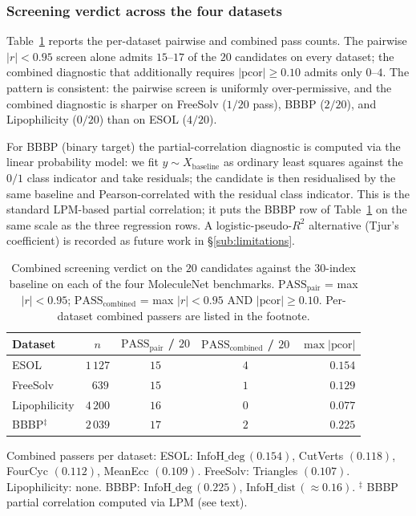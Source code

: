 \documentclass[STIX1COL]{WileyNJDv5}
\theoremstyle{definition}
\begin{document}
\subsubsection{Screening verdict across the four datasets}

Table~\ref{tab:novel_combined} reports the per-dataset pairwise and
combined pass counts. The pairwise $|r|<0.95$ screen alone admits
$15$--$17$ of the $20$ candidates on every dataset; the combined
diagnostic that additionally requires
$|\mathrm{pcor}|\ge 0.10$ admits only $0$--$4$. The pattern is
consistent: the pairwise screen is uniformly over-permissive, and
the combined diagnostic is sharper on FreeSolv ($1/20$ pass),
BBBP ($2/20$), and Lipophilicity ($0/20$) than on ESOL ($4/20$).

For BBBP (binary target) the partial-correlation diagnostic is
computed via the linear probability model: we fit
$y \sim X_{\mathrm{baseline}}$ as ordinary least squares against
the $0/1$ class indicator and take residuals; the candidate is
then residualised by the same baseline and Pearson-correlated
with the residual class indicator. This is the standard
LPM-based partial correlation; it puts the BBBP row of
Table~\ref{tab:novel_combined} on the same scale as the three
regression rows. A logistic-pseudo-$R^2$ alternative
(Tjur's coefficient) is recorded as future work in
\S\ref{sub:limitations}.

\begin{table}[h]
\centering
\caption{Combined screening verdict on the $20$ candidates against the $30$-index baseline on each of the four MoleculeNet benchmarks. $\mathrm{PASS}_{\mathrm{pair}}$ = max $|r| < 0.95$; $\mathrm{PASS}_{\mathrm{combined}}$ = max $|r| < 0.95$ AND $|\mathrm{pcor}|\ge 0.10$. Per-dataset combined passers are listed in the footnote.}
\label{tab:novel_combined}
\begin{tabular}{lcccr}
\toprule
Dataset & $n$ & $\mathrm{PASS}_{\mathrm{pair}}$ / $20$ & $\mathrm{PASS}_{\mathrm{combined}}$ / $20$ & $\max|\mathrm{pcor}|$\\
\midrule
ESOL          & $1\,127$ & $15$ & $4$ & $0.154$\\
FreeSolv      & $\phantom{0}639$  & $15$ & $1$ & $0.129$\\
Lipophilicity & $4\,200$ & $16$ & $0$ & $0.077$\\
BBBP$^\ddag$  & $2\,039$ & $17$ & $2$ & $0.225$\\
\bottomrule
\end{tabular}

\vspace{0.4em}
\noindent\small{Combined passers per dataset:
ESOL: $\mathrm{InfoH\_deg}\,(0.154)$, CutVerts $(0.118)$, FourCyc $(0.112)$, MeanEcc $(0.109)$.
FreeSolv: Triangles $(0.107)$.
Lipophilicity: none.
BBBP: $\mathrm{InfoH\_deg}\,(0.225)$, $\mathrm{InfoH\_dist}\,(\approx 0.16)$.
$^\ddag$ BBBP partial correlation computed via LPM (see text).}
\end{table}
\end{document}
